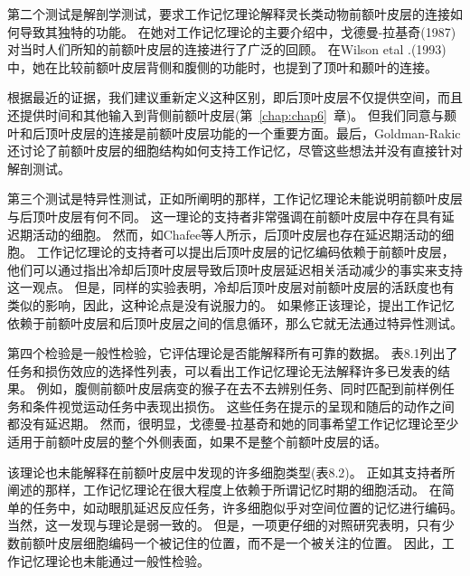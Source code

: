 第二个测试是解剖学测试，要求工作记忆理论解释灵长类动物前额叶皮层的连接如何导致其独特的功能。
在她对工作记忆理论的主要介绍中，戈德曼-拉基奇(1987)对当时人们所知的前额叶皮层的连接进行了广泛的回顾。
在Wilson etal .(1993)中，她在比较前额叶皮层背侧和腹侧的功能时，也提到了顶叶和颞叶的连接。
\par


根据最近的证据，我们建议重新定义这种区别，即后顶叶皮层不仅提供空间，而且还提供时间和其他输入到背侧前额叶皮层(第~\ref{chap:chap6}~章)。
但我们同意与颞叶和后顶叶皮层的连接是前额叶皮层功能的一个重要方面。最后，Goldman-Rakic还讨论了前额叶皮层的细胞结构如何支持工作记忆\cite{goldman1995cellular,constantinidis2001coding}，尽管这些想法并没有直接针对解剖测试。
\par


第三个测试是特异性测试，正如所阐明的那样，工作记忆理论未能说明前额叶皮层与后顶叶皮层有何不同。
这一理论的支持者非常强调在前额叶皮层中存在具有延迟期活动的细胞。
然而，如Chafee等人所示\cite{chafee1998matching}，后顶叶皮层也存在延迟期活动的细胞。
工作记忆理论的支持者可以提出后顶叶皮层的记忆编码依赖于前额叶皮层，他们可以通过指出冷却后顶叶皮层导致后顶叶皮层延迟相关活动减少的事实来支持这一观点\cite{chafee2000inactivation}。
但是，同样的实验表明，冷却后顶叶皮层对前额叶皮层的活跃度也有类似的影响，因此，这种论点是没有说服力的。
如果修正该理论，提出工作记忆依赖于前额叶皮层和后顶叶皮层之间的信息循环，那么它就无法通过特异性测试。
\par


第四个检验是一般性检验，它评估理论是否能解释所有可靠的数据。
表8.1列出了任务和损伤效应的选择性列表，可以看出工作记忆理论无法解释许多已发表的结果。
例如，腹侧前额叶皮层病变的猴子在去不去辨别任务\cite{iversen1970perseverative}、同时匹配到前样例任务\cite{rushworth1997ventral}和条件视觉运动任务\cite{bussey2001role}中表现出损伤。
这些任务在提示的呈现和随后的动作之间都没有延迟期。
然而，很明显，戈德曼-拉基奇和她的同事\cite{bussey2001role}希望工作记忆理论至少适用于前额叶皮层的整个外侧表面，如果不是整个前额叶皮层的话。
\par


该理论也未能解释在前额叶皮层中发现的许多细胞类型(表8.2)。
正如其支持者所阐述的那样，工作记忆理论在很大程度上依赖于所谓记忆时期的细胞活动。
在简单的任务中，如动眼肌延迟反应任务，许多细胞似乎对空间位置的记忆进行编码。
当然，这一发现与理论是弱一致的\cite{funahashi1989mnemonic}。
但是，一项更仔细的对照研究表明，只有少数前额叶皮层细胞编码一个被记住的位置，而不是一个被关注的位置\cite{lebedev2004representation}。
因此，工作记忆理论也未能通过一般性检验。
\par


